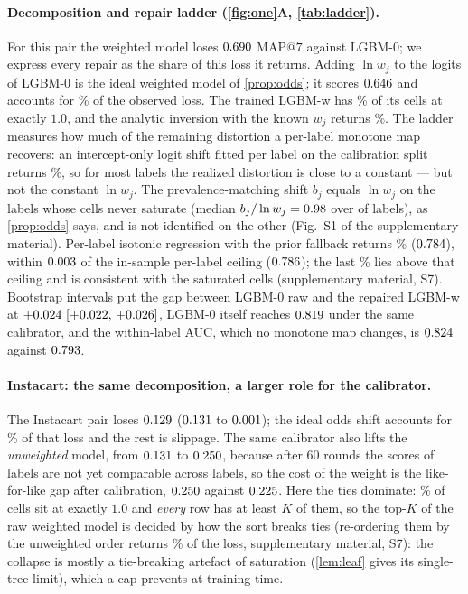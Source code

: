 \documentclass[runningheads]{llncs}
\makeatletter
\newcommand{\Sm}{\textsf{LGBM-w}\xspace}
\newcommand{\Nm}{\textsf{LGBM-0}\xspace}
\newcommand{\mapseven}{\mathrm{MAP}@7\xspace}
\newcommand{\Supp}[1]{supplementary material, #1}  %
\makeatother
\begin{document}
\paragraph{Decomposition and repair ladder (\cref{fig:one}A, \cref{tab:ladder}).} For this pair the weighted model loses $0.690$ $\mapseven$ against \Nm; we express every repair as the share of this loss it returns. Adding $\ln w_j$ to the logits of \Nm is the ideal weighted model of \cref{prop:odds}; it scores $0.646$ and accounts for \noddsShare\% of the observed loss. The trained \Sm has \nSsatOne\% of its cells at exactly $1.0$, and the analytic inversion with the known $w_j$ returns \nelkanShare\%. The ladder measures how much of the remaining distortion a per-label monotone map recovers: an intercept-only logit shift fitted per label on the calibration split returns \noffsetShare\%, so for most labels the realized distortion is close to a constant --- but not the constant $\ln w_j$. The prevalence-matching shift $b_j$ equals $\ln w_j$ on the labels whose cells never saturate (median $b_j/\ln w_j=0.98$ over \nSnIdentShift{} of \nnLabels{} labels), as \cref{prop:odds} says, and is not identified on the other \nnCappedShift{} (Fig.~S1 of the supplementary material). Per-label isotonic regression with the prior fallback returns \nrepairShare\% ($0.784$), within $0.003$ of the in-sample per-label ceiling ($0.786$); the last \ntieShare\% lies above that ceiling and is consistent with the saturated cells (\Supp{S7}). Bootstrap intervals put the gap between \Nm raw and the repaired \Sm at $+0.024~[+0.022,\,+0.026]$, \Nm itself reaches $0.819$ under the same calibrator, and the within-label AUC, which no monotone map changes, is $0.824$ against $0.793$.
\paragraph{Instacart: the same decomposition, a larger role for the calibrator.} The Instacart pair loses $0.129$ ($0.131$ to $0.001$); the ideal odds shift accounts for \nIoddsShare\% of that loss and the rest is slippage. The same calibrator also lifts the \emph{unweighted} model, from $0.131$ to $0.250$, because after 60 rounds the scores of \nInLabels{} labels are not yet comparable across labels, so the cost of the weight is the like-for-like gap after calibration, $0.250$ against $0.225$. Here the ties dominate: \nIStieCellsExactOne\% of cells sit at exactly $1.0$ and \emph{every} row has at least $K$ of them, so the top-$K$ of the raw weighted model is decided by how the sort breaks ties (re-ordering them by the unweighted order returns \nItieShareUnw\% of the loss, \Supp{S7}): the collapse is mostly a tie-breaking artefact of saturation (\cref{lem:leaf} gives its single-tree limit), which a cap prevents at training time.
\end{document}
